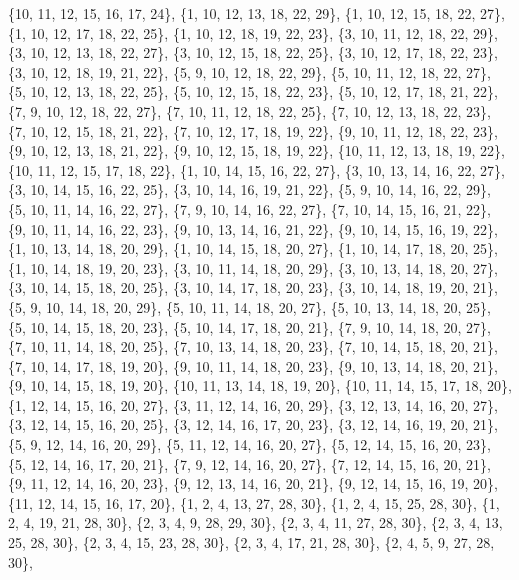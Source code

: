 \documentclass[11pt,a4paper]{article}
\begin{document}
{\{10, 11, 12, 15, 16, 17, 24\}, \{1, 10, 12, 13, 18, 22, 29\}, \{1, 10, 12, 15, 18, 22, 27\}, \{1, 10, 12, 17, 18, 22, 25\}, \{1, 10, 12, 18, 19, 22, 23\},
\{3, 10, 11, 12, 18, 22, 29\}, \{3, 10, 12, 13, 18, 22, 27\}, \{3, 10, 12, 15, 18, 22, 25\}, \{3, 10, 12, 17, 18, 22, 23\}, \{3, 10, 12, 18, 19, 21, 22\},
\{5, 9, 10, 12, 18, 22, 29\}, \{5, 10, 11, 12, 18, 22, 27\}, \{5, 10, 12, 13, 18, 22, 25\}, \{5, 10, 12, 15, 18, 22, 23\}, \{5, 10, 12, 17, 18, 21, 22\},
\{7, 9, 10, 12, 18, 22, 27\}, \{7, 10, 11, 12, 18, 22, 25\}, \{7, 10, 12, 13, 18, 22, 23\}, \{7, 10, 12, 15, 18, 21, 22\}, \{7, 10, 12, 17, 18, 19, 22\},
\{9, 10, 11, 12, 18, 22, 23\}, \{9, 10, 12, 13, 18, 21, 22\}, \{9, 10, 12, 15, 18, 19, 22\}, \{10, 11, 12, 13, 18, 19, 22\}, \{10, 11, 12, 15, 17, 18, 22\},
\{1, 10, 14, 15, 16, 22, 27\}, \{3, 10, 13, 14, 16, 22, 27\}, \{3, 10, 14, 15, 16, 22, 25\}, \{3, 10, 14, 16, 19, 21, 22\}, \{5, 9, 10, 14, 16, 22, 29\},
\{5, 10, 11, 14, 16, 22, 27\}, \{7, 9, 10, 14, 16, 22, 27\}, \{7, 10, 14, 15, 16, 21, 22\}, \{9, 10, 11, 14, 16, 22, 23\}, \{9, 10, 13, 14, 16, 21, 22\},
\{9, 10, 14, 15, 16, 19, 22\}, \{1, 10, 13, 14, 18, 20, 29\}, \{1, 10, 14, 15, 18, 20, 27\}, \{1, 10, 14, 17, 18, 20, 25\}, \{1, 10, 14, 18, 19, 20, 23\},
\{3, 10, 11, 14, 18, 20, 29\}, \{3, 10, 13, 14, 18, 20, 27\}, \{3, 10, 14, 15, 18, 20, 25\}, \{3, 10, 14, 17, 18, 20, 23\}, \{3, 10, 14, 18, 19, 20, 21\},
\{5, 9, 10, 14, 18, 20, 29\}, \{5, 10, 11, 14, 18, 20, 27\}, \{5, 10, 13, 14, 18, 20, 25\}, \{5, 10, 14, 15, 18, 20, 23\}, \{5, 10, 14, 17, 18, 20, 21\},
\{7, 9, 10, 14, 18, 20, 27\}, \{7, 10, 11, 14, 18, 20, 25\}, \{7, 10, 13, 14, 18, 20, 23\}, \{7, 10, 14, 15, 18, 20, 21\}, \{7, 10, 14, 17, 18, 19, 20\},
\{9, 10, 11, 14, 18, 20, 23\}, \{9, 10, 13, 14, 18, 20, 21\}, \{9, 10, 14, 15, 18, 19, 20\}, \{10, 11, 13, 14, 18, 19, 20\}, \{10, 11, 14, 15, 17, 18, 20\},
\{1, 12, 14, 15, 16, 20, 27\}, \{3, 11, 12, 14, 16, 20, 29\}, \{3, 12, 13, 14, 16, 20, 27\}, \{3, 12, 14, 15, 16, 20, 25\}, \{3, 12, 14, 16, 17, 20, 23\},
\{3, 12, 14, 16, 19, 20, 21\}, \{5, 9, 12, 14, 16, 20, 29\}, \{5, 11, 12, 14, 16, 20, 27\}, \{5, 12, 14, 15, 16, 20, 23\}, \{5, 12, 14, 16, 17, 20, 21\},
\{7, 9, 12, 14, 16, 20, 27\}, \{7, 12, 14, 15, 16, 20, 21\}, \{9, 11, 12, 14, 16, 20, 23\}, \{9, 12, 13, 14, 16, 20, 21\}, \{9, 12, 14, 15, 16, 19, 20\},
\{11, 12, 14, 15, 16, 17, 20\}, \{1, 2, 4, 13, 27, 28, 30\}, \{1, 2, 4, 15, 25, 28, 30\}, \{1, 2, 4, 19, 21, 28, 30\}, \{2, 3, 4, 9, 28, 29, 30\},
\{2, 3, 4, 11, 27, 28, 30\}, \{2, 3, 4, 13, 25, 28, 30\}, \{2, 3, 4, 15, 23, 28, 30\}, \{2, 3, 4, 17, 21, 28, 30\}, \{2, 4, 5, 9, 27, 28, 30\},
}
\end{document}
